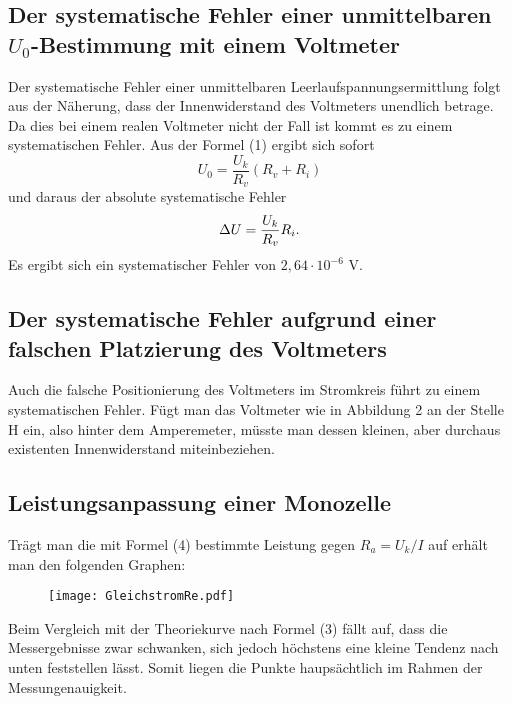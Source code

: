 \subsection{Der systematische Fehler einer unmittelbaren $U_0$-Bestimmung mit einem Voltmeter}
Der systematische Fehler einer unmittelbaren Leerlaufspannungsermittlung folgt aus der Näherung, dass
der Innenwiderstand des Voltmeters unendlich betrage. Da dies bei einem realen Voltmeter nicht der
Fall ist kommt es zu einem systematischen Fehler.
Aus der Formel (1) ergibt sich sofort
\begin{equation}
U_0 = \frac{U_k}{R_v}(R_v + R_i)
\end{equation}
und daraus der absolute systematische Fehler
\begin{equation}
\Delta U = \frac{U_k}{R_v}R_i \text.
\end{equation}
Es ergibt sich ein systematischer Fehler von $2,64 \cdot 10^{-6} $ V.





\subsection{Der systematische Fehler aufgrund einer falschen Platzierung des Voltmeters}
Auch die falsche Positionierung des Voltmeters im Stromkreis führt zu einem
systematischen Fehler. Fügt man das Voltmeter wie in Abbildung 2 an der Stelle H
ein, also hinter dem Amperemeter, müsste man dessen kleinen, aber durchaus existenten
Innenwiderstand miteinbeziehen.

\newpage
\subsection{Leistungsanpassung einer Monozelle}
Trägt man die mit Formel (4) bestimmte Leistung gegen $R_a = U_k/I$ auf erhält man
den folgenden Graphen:
\begin{figure}[H]
	\centering
	\caption{}
	\texttt{[image: GleichstromRe.pdf]}
	\label{fig:GleichstromLeistung}
\end{figure}
Beim Vergleich mit der Theoriekurve nach Formel (3) fällt auf, dass die Messergebnisse zwar schwanken, sich jedoch höchstens eine kleine Tendenz nach unten feststellen lässt. Somit liegen die Punkte haupsächtlich im Rahmen der Messungenauigkeit.
